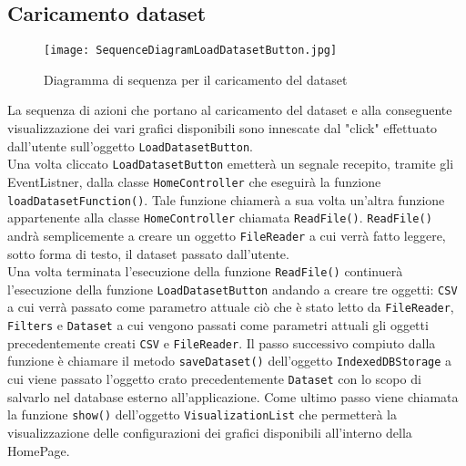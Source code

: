 \subsection{Caricamento dataset}
\begin{figure}[H]
	\centering
	\texttt{[image: SequenceDiagramLoadDatasetButton.jpg]}
	\caption{Diagramma di sequenza per il caricamento del dataset}
  \end{figure}
  La sequenza di azioni che portano al caricamento del dataset e alla conseguente visualizzazione dei vari grafici disponibili sono innescate dal "click" effettuato dall'utente sull'oggetto \texttt{LoadDatasetButton}.\\
Una volta cliccato \texttt{LoadDatasetButton} emetterà un segnale recepito, tramite gli EventListner, dalla classe \texttt{HomeController} che eseguirà la funzione\\ \texttt{loadDatasetFunction()}. Tale funzione chiamerà a sua volta un'altra funzione appartenente alla classe \texttt{HomeController} chiamata \texttt{ReadFile()}.
\texttt{ReadFile()} andrà semplicemente a creare un oggetto \texttt{FileReader} a cui verrà fatto leggere, sotto forma di testo, il dataset passato dall'utente. \\
Una volta terminata l'esecuzione della funzione \texttt{ReadFile()} continuerà l'esecuzione della funzione \texttt{LoadDatasetButton} andando a creare tre oggetti:
\texttt{CSV} a cui verrà passato come parametro attuale ciò che è stato letto da \texttt{FileReader}, \texttt{Filters} e \texttt{Dataset} a cui vengono passati come parametri attuali gli oggetti precedentemente creati \texttt{CSV} e \texttt{FileReader}.
Il passo successivo compiuto dalla funzione è chiamare il metodo \texttt{saveDataset()} dell'oggetto \texttt{IndexedDBStorage} a cui viene passato l'oggetto crato precedentemente \texttt{Dataset} con lo scopo di salvarlo nel database esterno all'applicazione.
Come ultimo passo viene chiamata la funzione \texttt{show()} dell'oggetto \texttt{VisualizationList} che permetterà la visualizzazione delle configurazioni dei grafici disponibili all'interno della HomePage.


